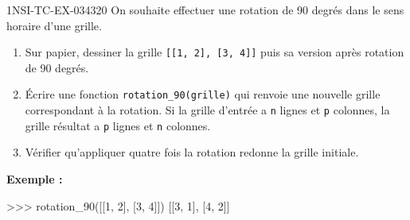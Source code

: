 \begin{exercice}{1NSI-TC-EX-034}{3}{20}
On souhaite effectuer une rotation de 90 degrés dans le sens horaire d'une grille.

\begin{enumerate}
  \item Sur papier, dessiner la grille \lstinline{[[1, 2], [3, 4]]} puis sa version
        après rotation de 90 degrés.
  \item Écrire une fonction \lstinline{rotation_90(grille)} qui renvoie une nouvelle
        grille correspondant à la rotation. Si la grille d'entrée a \lstinline{n}
        lignes et \lstinline{p} colonnes, la grille résultat a \lstinline{p} lignes
        et \lstinline{n} colonnes.
  \item Vérifier qu'appliquer quatre fois la rotation redonne la grille initiale.
\end{enumerate}

\textbf{Exemple :}
\begin{console}
>>> rotation_90([[1, 2], [3, 4]])
[[3, 1], [4, 2]]
\end{console}
\end{exercice}
